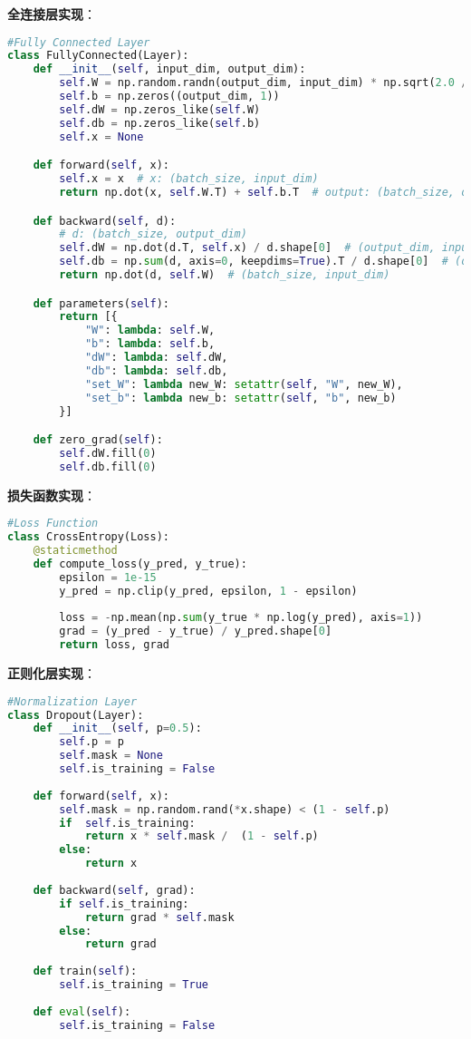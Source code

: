 \documentclass[a4paper, twocolumn]{article}
\begin{document}
\noindent \textbf{全连接层实现}：
\begin{lstlisting}[language=Python]
#Fully Connected Layer
class FullyConnected(Layer):
    def __init__(self, input_dim, output_dim):
        self.W = np.random.randn(output_dim, input_dim) * np.sqrt(2.0 / input_dim)  
        self.b = np.zeros((output_dim, 1))
        self.dW = np.zeros_like(self.W)
        self.db = np.zeros_like(self.b)
        self.x = None

    def forward(self, x):
        self.x = x  # x: (batch_size, input_dim)
        return np.dot(x, self.W.T) + self.b.T  # output: (batch_size, output_dim)

    def backward(self, d):
        # d: (batch_size, output_dim)
        self.dW = np.dot(d.T, self.x) / d.shape[0]  # (output_dim, input_dim)
        self.db = np.sum(d, axis=0, keepdims=True).T / d.shape[0]  # (output_dim, 1)
        return np.dot(d, self.W)  # (batch_size, input_dim)

    def parameters(self):
        return [{
            "W": lambda: self.W, 
            "b": lambda: self.b, 
            "dW": lambda: self.dW, 
            "db": lambda: self.db,
            "set_W": lambda new_W: setattr(self, "W", new_W), 
            "set_b": lambda new_b: setattr(self, "b", new_b)  
        }]

    def zero_grad(self):
        self.dW.fill(0)  
        self.db.fill(0)
\end{lstlisting}

\noindent \textbf{损失函数实现}：
\begin{lstlisting}[language=Python]
#Loss Function
class CrossEntropy(Loss):
    @staticmethod
    def compute_loss(y_pred, y_true):
        epsilon = 1e-15
        y_pred = np.clip(y_pred, epsilon, 1 - epsilon)
        
        loss = -np.mean(np.sum(y_true * np.log(y_pred), axis=1))
        grad = (y_pred - y_true) / y_pred.shape[0] 
        return loss, grad
\end{lstlisting}

\noindent \textbf{正则化层实现}：
\begin{lstlisting}[language=Python]
#Normalization Layer
class Dropout(Layer):
    def __init__(self, p=0.5):
        self.p = p
        self.mask = None
        self.is_training = False
        
    def forward(self, x):
        self.mask = np.random.rand(*x.shape) < (1 - self.p) 
        if  self.is_training:
            return x * self.mask /  (1 - self.p)
        else:
            return x
    
    def backward(self, grad):
        if self.is_training:
            return grad * self.mask
        else:
            return grad
    
    def train(self):
        self.is_training = True
        
    def eval(self):
        self.is_training = False
\end{lstlisting}
\end{document}

